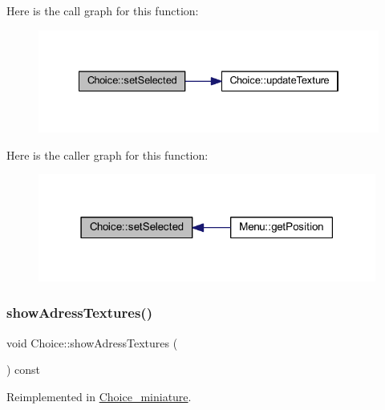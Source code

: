 Here is the call graph for this function\+:
\nopagebreak
\begin{figure}[H]
\begin{center}
\leavevmode
\includegraphics[width=334pt]{class_choice_aa4bbe520ca9f933327fc1f678d6626f8_cgraph}
\end{center}
\end{figure}
Here is the caller graph for this function\+:
\nopagebreak
\begin{figure}[H]
\begin{center}
\leavevmode
\includegraphics[width=315pt]{class_choice_aa4bbe520ca9f933327fc1f678d6626f8_icgraph}
\end{center}
\end{figure}
\mbox{\label{class_choice_ad29163ceee43a59dba6ea46452ca46c0}} 
\subsubsection{\texorpdfstring{show\+Adress\+Textures()}{showAdressTextures()}}
{\footnotesize\ttfamily void Choice\+::show\+Adress\+Textures (\begin{DoxyParamCaption}{ }\end{DoxyParamCaption}) const\hspace{0.3cm}{\ttfamily [virtual]}}



Reimplemented in \hyperlink{class_choice__miniature_a6f413024d98b0c334c5a3e6ec87eba9b}{Choice\+\_\+miniature}.


